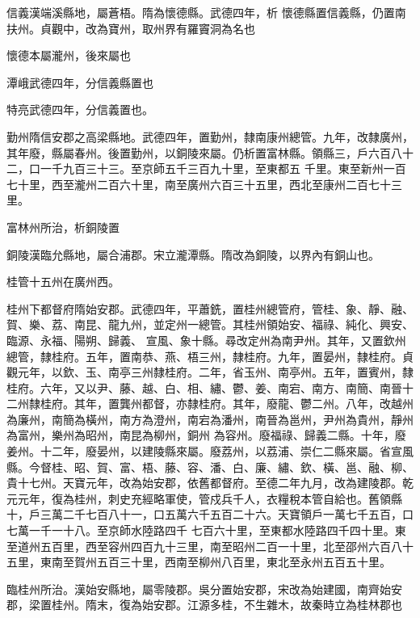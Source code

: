 \begin{pinyinscope}
 信義漢端溪縣地，屬蒼梧。隋為懷德縣。武德四年，析
 懷德縣置信義縣，仍置南扶州。貞觀中，改為寶州，取州界有羅竇洞為名也



 懷德本屬瀧州，後來屬也



 潭峨武德四年，分信義縣置也



 特亮武德四年，分信義置也。



 勤州隋信安郡之高梁縣地。武德四年，置勤州，隸南康州總管。九年，改隸廣州，其年廢，縣屬春州。後置勤州，以銅陵來屬。仍析置富林縣。領縣三，戶六百八十二，口一千九百三十三。至京師五千三百九十里，至東都五
 千里。東至新州一百七十里，西至瀧州二百六十里，南至廣州六百三十五里，西北至康州二百七十三里。



 富林州所治，析銅陵置



 銅陵漢臨允縣地，屬合浦郡。宋立瀧潭縣。隋改為銅陵，以界內有銅山也。



 桂管十五州在廣州西。



 桂州下都督府隋始安郡。武德四年，平蕭銑，置桂州總管府，管桂、象、靜、融、賀、樂、荔、南昆、龍九州，並定州一總管。其桂州領始安、福祿、純化、興安、臨源、永福、陽朔、歸義、
 宣風、象十縣。尋改定州為南尹州。其年，又置欽州總管，隸桂府。五年，置南恭、燕、梧三州，隸桂府。九年，置晏州，隸桂府。貞觀元年，以欽、玉、南亭三州隸桂府。二年，省玉州、南亭州。五年，置賓州，隸桂府。六年，又以尹、藤、越、白、相、繡、鬱、姜、南宕、南方、南簡、南晉十二州隸桂府。其年，置龔州都督，亦隸桂府。其年，廢龍、鬱二州。八年，改越州為廉州，南簡為橫州，南方為澄州，南宕為潘州，南晉為邕州，尹州為貴州，靜州為富州，樂州為昭州，南昆為柳州，銅州
 為容州。廢福祿、歸義二縣。十年，廢姜州。十二年，廢晏州，以建陵縣來屬。廢荔州，以荔浦、崇仁二縣來屬。省宣風縣。今督桂、昭、賀、富、梧、藤、容、潘、白、廉、繡、欽、橫、邕、融、柳、貴十七州。天寶元年，改為始安郡，依舊都督府。至德二年九月，改為建陵郡。乾元元年，復為桂州，刺史充經略軍使，管戍兵千人，衣糧稅本管自給也。舊領縣十，戶三萬二千七百八十一，口五萬六千五百二十六。天寶領戶一萬七千五百，口七萬一千一十八。至京師水陸路四千
 七百六十里，至東都水陸路四千四十里。東至道州五百里，西至容州四百九十三里，南至昭州二百一十里，北至邵州六百八十五里，東南至賀州五百三十里，西南至柳州八百里，東北至永州五百五十里。



 臨桂州所治。漢始安縣地，屬零陵郡。吳分置始安郡，宋改為始建國，南齊始安郡，梁置桂州。隋末，復為始安郡。江源多桂，不生雜木，故秦時立為桂林郡也




\end{pinyinscope}
